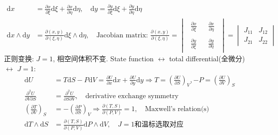 \documentclass[../../main.tex]{subfiles}
\begin{document}
\begin{align*}
    \mathrm{d}x &= \frac{\partial x}{\partial\xi}\mathrm{d}\xi + \frac{\partial x}{\partial \eta}\mathrm{d}\eta,\quad \mathrm{d}y = \frac{\partial y}{\partial\xi}\mathrm{d}\xi + \frac{\partial y}{\partial\eta}\mathrm{d}\eta\\
    \mathrm{d}x\wedge\mathrm{d}y &= \frac{\partial (x,y)}{\partial (\xi,\eta)}\mathrm{d}\xi\wedge\mathrm{d}\eta,\quad \text{Jacobian matrix: }\frac{\partial (x,y)}{\partial (\xi,\eta)} = \begin{vmatrix}
        \begin{aligned}
            \frac{\partial x}{\partial\xi}
        \end{aligned} & \begin{aligned}
            \frac{\partial x}{\partial\eta}
        \end{aligned}\\
        \begin{aligned}
            \frac{\partial y}{\partial\xi}
        \end{aligned} & \begin{aligned}
            \frac{\partial y}{\partial\eta}
        \end{aligned}
    \end{vmatrix} = \begin{vmatrix}
        J_{11} & J_{12}\\
        J_{21} & J_{22}
    \end{vmatrix}
\end{align*}
正则变换: $J = 1$, 相空间体积不变. State function $\leftrightarrow $ total differential(全微分) $\leftrightarrow$ $J = 1$:
\begin{align*}
    \mathrm{d}U &= T\mathrm{d}S - P\mathrm{d}V = \frac{\partial U}{\partial x}\mathrm{d}x + \frac{\partial U}{\partial y}\mathrm{d}y\Rightarrow
    T = \left(\frac{\partial U}{\partial S}\right)_{V}, -P = \left(\frac{\partial U}{\partial V}\right)_{S}\\
    \frac{\partial^{2}U}{\partial V\partial S} &= \frac{\partial^{2}U}{\partial S\partial V},\quad \text{derivative exchange symmetry}\\
    \left(\frac{\partial T}{\partial V}\right)_{S} &= -\left(\frac{\partial P}{\partial S}\right)_{V}\Rightarrow \frac{\partial (T,S)}{\partial (P,V)} = 1, \quad \text{Maxwell's relation(s)}\\
    \mathrm{d}T\wedge\mathrm{d}S &= \frac{\partial (T,S)}{\partial (P,V)}\mathrm{d}P\wedge\mathrm{d}V,\quad J = 1 \text{和温标选取对应}
\end{align*}
\end{document}
